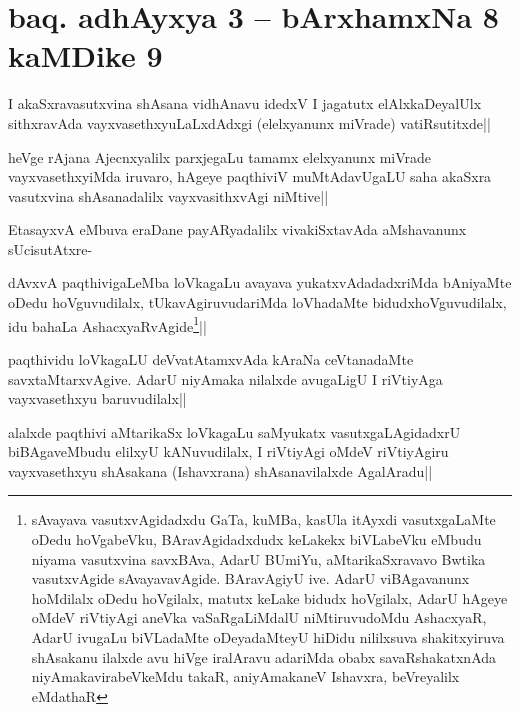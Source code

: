 \section*{baq. adhAyxya 3 -- bArxhamxNa 8 kaMDike 9}


\stext

\begin{artha}%
I akaSxravasutxvina shAsana vidhAnavu idedxV I jagatutx elAlxkaDeyalUlx sithxravAda vayxvasethxyuLaLxdAdxgi (elelxyanunx miVrade) vatiRsutitxde||
\end{artha}

\begin{artha}
heVge rAjana Ajecnxyalilx parxjegaLu tamamx elelxyanunx miVrade vayxvasethxyiMda iruvaro, hAgeye paqthiviV muMtAdavUgaLU saha akaSxra vasutxvina shAsanadalilx vayxvasithxvAgi niMtive||
\end{artha}


\begin{artha}
EtasayxvA eMbuva eraDane payARyadalilx vivakiSxtavAda aMshavanunx sUcisutAtxre-
\end{artha}

\begin{artha}%
dAvxvA paqthivigaLeMba loVkagaLu avayava yukatxvAdadadxriMda bAniyaMte oDedu hoVguvudilalx, tUkavAgiruvudariMda loVhadaMte bidudxhoVguvudilalx, idu bahaLa AshacxyaRvAgide\footnote[1]{sAvayava vasutxvAgidadxdu GaTa, kuMBa, kasUla itAyxdi vasutxgaLaMte oDedu hoVgabeVku, BAravAgidadxdudx keLakekx biVLabeVku eMbudu niyama vasutxvina savxBAva, AdarU BUmiYu, aMtarikaSxravavo Bwtika vasutxvAgide sAvayavavAgide. BAravAgiyU ive. AdarU viBAgavanunx hoMdilalx oDedu hoVgilalx, matutx keLake bidudx hoVgilalx, AdarU hAgeye oMdeV riVtiyAgi aneVka vaSaRgaLiMdalU niMtiruvudoMdu AshacxyaR, AdarU ivugaLu biVLadaMte oDeyadaMteyU hiDidu nililxsuva shakitxyiruva shAsakanu ilalxde avu hiVge iralAravu adariMda obabx savaRshakatxnAda niyAmakavirabeVkeMdu takaR, aniyAmakaneV Ishavxra, beVreyalilx eMdathaR}||
\end{artha}

\begin{artha}
paqthividu loVkagaLU deVvatAtamxvAda kAraNa ceVtanadaMte savxtaMtarxvAgive. AdarU niyAmaka nilalxde avugaLigU I riVtiyAga vayxvasethxyu baruvudilalx||
\end{artha}

\begin{artha}
alalxde paqthivi aMtarikaSx loVkagaLu saMyukatx vasutxgaLAgidadxrU biBAgaveMbudu elilxyU kANuvudilalx, I riVtiyAgi oMdeV riVtiyAgiru vayxvasethxyu shAsakana (Ishavxrana) shAsanavilalxde AgalAradu||
\end{artha}

